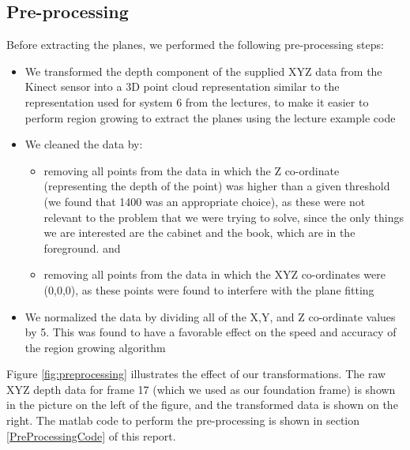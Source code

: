 \subsection{Pre-processing}
Before extracting the planes, we performed the following pre-processing steps:

\begin{itemize}
	\item We transformed the depth component of the supplied XYZ data from the Kinect sensor into a 3D point cloud representation similar to the representation used for system 6 from the lectures, to make it easier to perform region growing to extract the planes using the lecture example code
	\item We cleaned the data by:
		\begin{itemize}
			\item removing all points from the data in which the Z co-ordinate (representing the depth of the point) was higher than a given threshold (we found that 1400 was an appropriate choice), as these were not relevant to the problem that we were trying to solve, since the only things we are interested are the cabinet and the book, which are in the foreground. and
			\item removing all points from the data in which the XYZ co-ordinates were (0,0,0), as these points were found to interfere with the plane fitting
		\end{itemize}
	\item We normalized the data by dividing all of the X,Y, and Z co-ordinate values by 5. This was found to have a favorable effect on the speed and accuracy of the region growing algorithm
\end{itemize}

Figure \ref{fig:preprocessing} illustrates the effect of our transformations. The raw XYZ depth data for frame 17 (which we used as our foundation frame) is shown in the picture on the left of the figure, and the transformed data is shown on the right. The matlab code to perform the pre-processing is shown in section \ref{PreProcessingCode} of this report.


